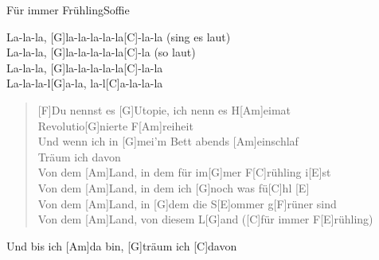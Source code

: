 \begin{song}{F\"ur immer Fr\"uhling}{Soffie}
    \begin{chorus}
        [Am]La-la-la, [G]la-la-la-la-la[C]-la-la (sing es laut) \\
        [Am]La-la-la, [G]la-la-la-la-la[C]-la (so laut) \\
        [Am]La-la-la, [G]la-la-la-la-la[C]-la-la \\
        [Am]La-la-la-l[G]a-la, la-l[C]a-la-la-la 
    \end{chorus}

    \begin{verse}  
        [F]Du nennst es [G]Utopie, ich nenn es H[Am]eimat \\
        [F]Revolutio[G]nierte F[Am]reiheit \\
        [F]Und wenn ich in [G]mei'm Bett abends [Am]einschlaf \\
        [E7]Träum ich davon \\
        Von dem [Am]Land, in dem für im[G]mer F[C]rühling i[E]st \\
        Von dem [Am]Land, in dem ich [G]noch was fü[C]hl [E] \\
        Von dem [Am]Land, in [G]dem die S[E]ommer g[F]rüner sind \\
        Von dem [Am]Land, von diesem L[G]and ([C]für immer F[E]rühling) 
    \end{verse}  

    \begin{outro}
        Und bis ich [Am]da bin, [G]träum ich [C]davon
    \end{outro}

\end{song}
